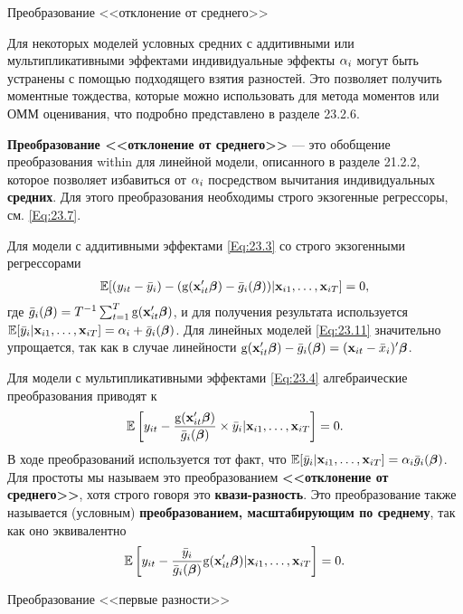 {\centering Преобразование <<отклонение от среднего>> \\}

Для некоторых моделей условных средних с аддитивными или мультипликативными эффектами индивидуальные эффекты $\alpha_i$ могут быть устранены с помощью подходящего взятия разностей. Это позволяет получить моментные тождества, которые можно использовать для метода моментов или ОММ оценивания, что подробно представлено в разделе 23.2.6.

\textbf{Преобразование <<отклонение от среднего>>} --- это обобщение преобразования within для линейной модели, описанного в разделе 21.2.2, которое позволяет избавиться от $\alpha_i$ посредством вычитания индивидуальных \textbf{средних}. Для этого преобразования необходимы строго экзогенные регрессоры, см. \ref{Eq:23.7}.

Для модели с аддитивными эффектами \ref{Eq:23.3} со строго экзогенными регрессорами
\begin{align}
\mathbb{E}[(y_{it}-\bar{y}_i)-(\mathrm g(\mathbf{x}'_{it}\bm{\beta})-\bar{g}_i(\bm{\beta}))|\mathbf{x}_{i1},\dots,\mathbf{x}_{iT}]=0,
\label{Eq:23.11}
\end{align}
где $\bar{g}_i(\bm{\beta})=T^{-1}\sum^T_{t=1}\mathrm g(\mathbf{x}'_{it}\bm{\beta})$, и для получения результата используется $\mathbb{E}[\bar{y}_i|\mathbf{x}_{i1}, \dots, \mathbf{x}_{iT}]=\alpha_i+\bar{g}_i(\bm{\beta})$. Для линейных моделей \ref{Eq:23.11} значительно упрощается, так как в случае линейности $\mathrm g(\mathbf{x}'_{it}\bm{\beta})-\bar{g}_i(\bm{\beta})=(\mathbf{x}_{it}-\bar{x}_i)'\bm{\beta}$.

Для модели с мультипликативными эффектами \ref{Eq:23.4} алгебраические преобразования приводят к 
\begin{align}
\mathbb{E}\left[y_{it}-\frac{\mathrm g(\mathbf{x}'_{it}\bm{\beta})}{\bar{g}_i(\bm{\beta})}\times \bar{y}_i|\mathbf{x}_{i1},\dots, \mathbf{x}_{iT} \right]=0.
\label{Eq:23.12}
\end{align}
В ходе преобразований используется тот факт, что $\mathbb{E}[\bar{y}_i|\mathbf{x}_{i1}, \dots, \mathbf{x}_{iT}]=\alpha_i\bar{g}_i(\bm{\beta})$. Для простоты мы называем это преобразованием \textbf{<<отклонение от среднего>>}, хотя строго говоря это \textbf{квази-разность}. Это преобразование также называется (условным) \textbf{преобразованием, масштабирующим по среднему}, так как оно эквивалентно
\begin{align}
\mathbb{E} \left[y_{it}-\frac{\bar{y}_i}{\bar{g}_i(\bm{\beta})}\mathrm g(\mathbf{x}'_{it}\bm{\beta})|\mathbf{x}_{i1}, \dots, \mathbf{x}_{iT} \right] = 0.
\nonumber
\end{align}

{\centering Преобразование <<первые разности>> \\}

